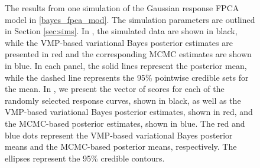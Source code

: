 \documentclass[12pt]{article}
\theoremstyle{plain}
\theoremstyle{definition}
\theoremstyle{remark}
\begin{document}
\begin{figure}[t!]
\centering
\tabskip=0pt
\caption{
	The results from one simulation of the Gaussian response FPCA model in \eqref{bayes_fpca_mod}. The
	simulation parameters are outlined in Section \ref{sec:sims}.
	In , the simulated data are shown in black, while the VMP-based
	variational Bayes posterior estimates are presented in red and the corresponding MCMC estimates
	are shown in blue. In each panel, the solid lines represent
	the posterior mean, while the dashed line represents the 95\% pointwise credible sets for the mean.
	In , we present the vector of scores for each of the
	randomly selected response curves,
	shown in black, as well as the VMP-based variational Bayes posterior estimates, shown in red, and the
	MCMC-based posterior estimates, shown in blue. The red and blue dots represent the VMP-based
	variational Bayes posterior means and the MCMC-based posterior means, respectively.
	The ellipses represent the 95\% credible contours.
}
\label{fig:gauss_resp_sim}
\end{figure}
\end{document}
